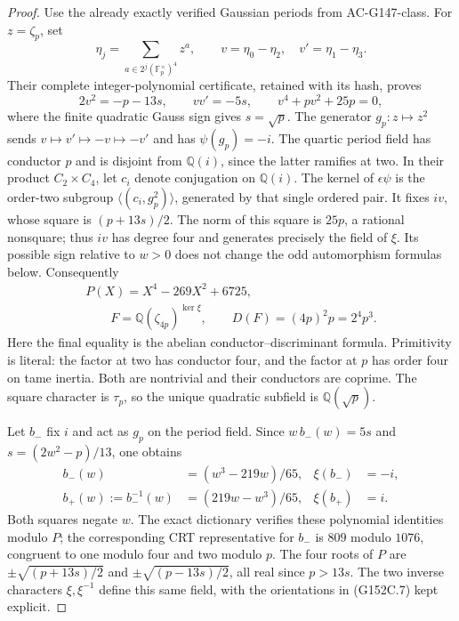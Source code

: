 \begin{proof}
Use the already exactly verified Gaussian periods from AC-G147-class.
For $z=\zeta_p$, set
\[
 \eta_j=\sum_{a\in2^j(\mathbb F_p^\times)^4}z^a,
 \qquad v=\eta_0-\eta_2,\quad v'=\eta_1-\eta_3.
 \tag{G152C.4}
\]
Their complete integer-polynomial certificate, retained with its
hash, proves
\[
 2v^2=-p-13s,\qquad vv'=-5s,\qquad
 v^4+pv^2+25p=0,
 \tag{G152C.5}
\]
where the finite quadratic Gauss sign gives $s=\sqrt p$.
The generator $g_p:z\mapsto z^2$ sends
$v\mapsto v'\mapsto-v\mapsto-v'$ and has $\psi(g_p)=-i$.
The quartic period field has conductor $p$ and is disjoint
from $\mathbb Q(i)$, since the latter ramifies at two.
In their product $C_2\times C_4$, let $c_i$ denote conjugation
on $\mathbb Q(i)$.  The kernel of $\epsilon\psi$ is the
order-two subgroup $\langle(c_i,g_p^2)\rangle$, generated by
that single ordered pair.
It fixes $iv$, whose square is $(p+13s)/2$.
The norm of this square is $25p$, a rational nonsquare;
thus $iv$ has degree four and generates precisely the field of $\xi$.
Its possible sign relative to $w>0$ does not change the odd
automorphism formulas below.
Consequently
\[
 \begin{gathered}
 P(X)=X^4-269X^2+6725,\\
 \qquad F=\mathbb Q(\zeta_{4p})^{\ker\xi},\qquad
 D(F)=(4p)^2p=2^4p^3.
 \end{gathered}
 \tag{G152C.6}
\]
Here the final equality is the abelian conductor--discriminant formula.
Primitivity is literal: the factor at two has conductor four,
and the factor at $p$ has order four on tame inertia.
Both are nontrivial and their conductors are coprime.
The square character is $\tau_p$, so the unique quadratic
subfield is $\mathbb Q(\sqrt p)$.

Let $b_-$ fix $i$ and act as $g_p$ on the period field.
Since $w\,b_-(w)=5s$ and $s=(2w^2-p)/13$, one obtains
\[
 \begin{aligned}
 b_-(w)&=(w^3-219w)/65,&\xi(b_-)&=-i,\\
 b_+(w):=b_-^{-1}(w)&=(219w-w^3)/65,&\xi(b_+)&=i.
 \end{aligned}
 \tag{G152C.7}
\]
Both squares negate $w$.
The exact dictionary verifies these polynomial identities modulo $P$;
the corresponding CRT representative for $b_-$ is $809$ modulo $1076$,
congruent to one modulo four and two modulo $p$.
The four roots of $P$ are
$\pm\sqrt{(p+13s)/2}$ and $\pm\sqrt{(p-13s)/2}$,
all real since $p>13s$.
The two inverse characters $\xi,\xi^{-1}$ define this same field,
with the orientations in (G152C.7) kept explicit.


\end{proof}
